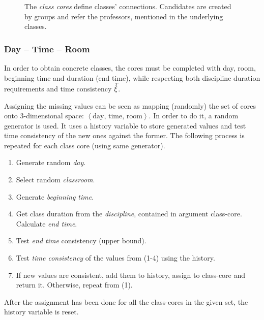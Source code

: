 \documentclass[../../ThesisDoc]{subfiles}
\begin{document}

\begin{figure}[h]
  \centering
  
  \caption{The \emph{class cores} define classes' connections. Candidates are
           created by groups and refer the professors, mentioned in the
           underlying classes. }
  \label{fig:class-cores}
\end{figure}

\subsubsection{Day -- Time -- Room}
\label{sec:solution-DTR}

In order to obtain concrete classes, the cores must be completed with day, room,
beginning time and duration (end time), while respecting both discipline duration
requirements and time consistency $\accentset{T}{\xi}$.

Assigning the missing values can be seen as mapping (randomly) the set of cores onto
3-dimensional space: $\left< \text{day, time, room} \right>$.
In order to do it, a random generator is used. It uses a history variable to
store generated values and test time consistency of the new ones against the former.
The following process is repeated for each class core (using same generator).
\begin{enumerate}
  \item Generate random \emph{day}.
  \item Select random \emph{classroom}.
  \item Generate \emph{beginning time}.
  \item Get class duration from the \emph{discipline}, contained in argument class-core.
        Calculate \emph{end time}.
  \item Test \emph{end time} consistency (upper bound).
  \item Test \emph{time consistency} of the values from (1-4) using the history.
  \item If new values are consistent, add them to history, assign to class-core
        and return it.
        Otherwise, repeat from (1).

\end{enumerate}
After the assignment has been done for all the class-cores in the given set,
the history variable is reset.
\end{document}
